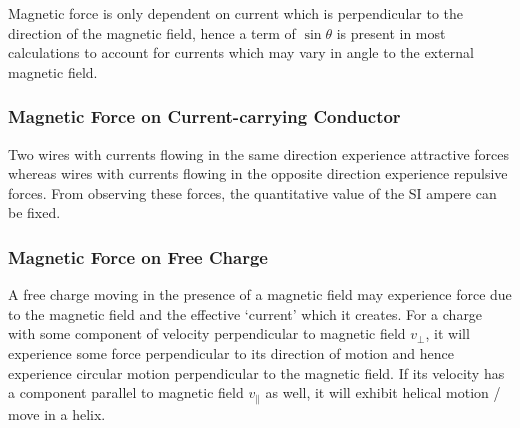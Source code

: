 \documentclass[../main]{subfiles}
\begin{document}
	Magnetic force is only dependent on current which is perpendicular to the direction of the magnetic field, hence a term of \(\sin \theta\) is present in most calculations to account for currents which may vary in angle to the external magnetic field.

	\subsubsection{Magnetic Force on Current-carrying Conductor}


	Two wires with currents flowing in the same direction experience attractive forces whereas wires with currents flowing in the opposite direction experience repulsive forces. From observing these forces, the quantitative value of the SI ampere can be fixed.


	\subsubsection{Magnetic Force on Free Charge}


	A free charge moving in the presence of a magnetic field may experience force due to the magnetic field and the effective `current' which it creates. For a charge with some component of velocity perpendicular to magnetic field \(v_\perp\), it will experience some force perpendicular to its direction of motion and hence experience circular motion perpendicular to the magnetic field. If its velocity has a component parallel to magnetic field \(v_\parallel\) as well, it will exhibit helical motion / move in a helix. \\


\end{document}
